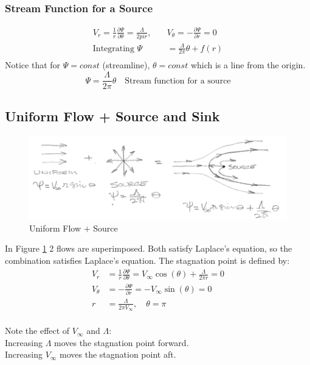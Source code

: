 \documentclass[draft=false, titlepage]{article}
\newcommand{\partialfrac}[2]{\frac{\partial #1}{\partial #2}}
\begin{document}
\subsubsection{Stream Function for a Source}
\begin{align*}
    V_r = \frac{1}{r} \partialfrac{\Psi}{\theta} = \frac{\Lambda}{2pi r}, \quad & V_\theta = -\partialfrac{\Psi}{r} = 0 \\
    \text{Integrating } \Psi &= \frac{\Lambda}{2\pi}\theta + f(r)\\
\end{align*}
Notice that for $\Psi = const$ (streamline), $\theta=const$ which is a line from the origin.
\begin{equation*}
    \boxed{\Psi = \frac{\Lambda}{2\pi}\theta} \quad \text{Stream function for a source}
\end{equation*}

\subsection{Uniform Flow + Source and Sink}
\begin{figure}[ht]
    \centering
    \includegraphics[width=0.8\linewidth]{Figures/uniformPlusSourceFlow.PNG}
    \caption{Uniform Flow + Source}
    \label{fig:UniformPlusSourceFlow}
\end{figure}
In Figure \ref{fig:UniformPlusSourceFlow} 2 flows are superimposed. Both satisfy Laplace's equation, so the combination satisfies Laplace's equation. The stagnation point is defined by:
\begin{align*}
    V_r &=\frac{1}{r} \partialfrac{\Psi}{\theta} = V_\infty \cos(\theta) + \frac{\Lambda}{2\pi r} = 0\\
    V_\theta &= -\partialfrac{\Psi}{r} = -V_\infty \sin(\theta) = 0\\
    r &= \frac{\Lambda}{2\pi V_\infty},\quad \theta = \pi\\
\end{align*}

Note the effect of $V_\infty$ and $\Lambda$:\\
Increasing $\Lambda$ moves the stagnation point forward.\\
Increasing $V_\infty$ moves the stagnation point aft.
\end{document}
